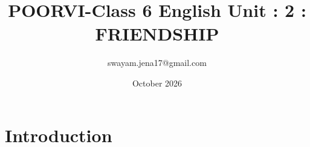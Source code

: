 \documentclass{book}
\begin{document}
\title{POORVI-Class 6 English Unit : 2 : FRIENDSHIP}
\author{swayam.jena17@gmail.com}
\date{October 2026}


\maketitle
\section{Introduction}




\end{document}
